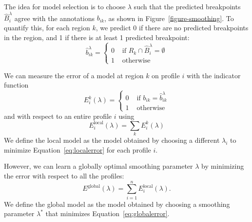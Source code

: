 \documentclass{bioinfo}
\begin{document}
\begin{methods}
The idea for model selection is to choose $\lambda$ such that the
predicted breakpoints $\hat B_i^\lambda$ agree with the annotations
$b_{ik}$, as shown in Figure~\ref{figure-smoothing}. To quantify this,
for each region $k$, we predict 0 if there are no predicted
breakpoints in the region, and 1 if there is at least 1 predicted
breakpoint:
\begin{equation}
  \label{eq:bikhat}
  \hat b_{ik}^\lambda =
  \begin{cases}
    0 & \text{ if } R_k\cap\hat B_i^\lambda = \emptyset\\
    1 & \text{ otherwise}
  \end{cases}
\end{equation}

We can measure the error of a model
at region $k$ on profile $i$ with the indicator function
\begin{equation}
  \label{eq:1error}
  E^k_i(\lambda)= 
  \begin{cases}
    0 & \text{ if }b_{ik}=\hat b_{ik}^\lambda\\
    1 & \text{ otherwise}
  \end{cases}
\end{equation}
and with respect to an entire profile $i$ using
\begin{equation}
  \label{eq:localerror}
  E_i^{\text{local}}(\lambda)=\sum_{k}E^k_i(\lambda)
\end{equation}
We define the local model as the model obtained by choosing a
different $\lambda_i$ to minimize Equation~\ref{eq:localerror} for
each profile $i$.

However, we can learn a globally optimal smoothing parameter $\lambda$
by minimizing the error with respect to all the profiles:
\begin{equation}
  \label{eq:globalerror}
  E^{\text{global}}(\lambda)=\sum_{i=1}^n E_i^{\text{local}}(\lambda).
\end{equation}
We define the global model as the model obtained by choosing a
smoothing parameter $\lambda^*$ that minimizes
Equation~\ref{eq:globalerror}.


\end{methods}
\end{document}
